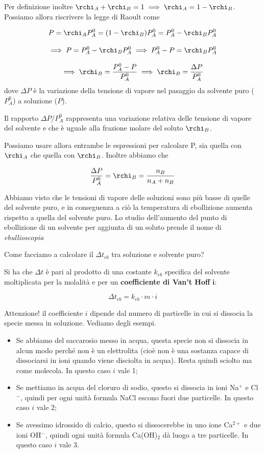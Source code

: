 Per definizione inoltre $\rchi_A + \rchi_B = 1 \implies \rchi_A = 1 - \rchi_B$. Possiamo allora riscrivere la legge di Raoult come 

$$P=\rchi_AP^0_A=(1- \rchi_B)P^0_A=P^0_A - \rchi_BP^0_A$$

$$\implies P=P^0_A - \rchi_BP^0_A \implies P^0_A - P = \rchi_BP^0_A$$

$$\implies \rchi_B=\frac{P^0_A - P}{P^0_A} \implies \rchi_B=\frac{\Delta P}{P^0_A}$$
dove $\Delta P$ è la variazione della tensione di vapore nel pasaggio da solvente puro ($P_A^0$) a soluzione ($P$).

Il rapporto $\Delta P/P_A^0$ rappresenta una variazione relativa delle tensione di vapore del solvente e che è uguale alla frazione molare del soluto $\rchi_B$.

Possiamo usare allora entrambe le espressioni per calcolare P, sia quella con $\rchi_A$ che quella con $\rchi_B$. Inoltre abbiamo che

$$\frac{\Delta P}{P_A^0}= \rchi_B = \frac{n_B}{n_A + n_B}$$

Abbiamo visto che le tensioni di vapore delle soluzioni sono più basse di quelle del solvente puro, e in conseguenza a ciò la temperatura di ebollizione aumenta rispetto a quella del solvente puro. Lo studio dell'aumento del punto di ebollizione di un solvente per aggiunta di un soluto prende il nome di \textit{ebullioscopia}

Come facciamo a calcolare il $\Delta t_{eb}$ tra soluzione e solvente puro?

Si ha che $\Delta t$ è pari al prodotto di una costante $k_{eb}$ specifica del solvente moltiplicata per la molalità e per un \textbf{coefficiente di Van't Hoff} $\boldsymbol{i}$:

$$\Delta t_{eb} = k_{eb} \cdot m \cdot i$$

Attenzione! il coefficiente $i$ dipende dal numero di particelle in cui si dissocia la specie messa in soluzione. Vediamo degli esempi.

\begin{itemize}
    \item Se abbiamo del saccarosio messo in acqua, questa specie non si dissocia in alcun modo perché non è un elettrolita (cioè non è una sostanza capace di dissociarsi in ioni quando viene disciolta in acqua). Resta quindi sciolto ma come molecola. In questo caso $i$ vale 1;
    \item Se mettiamo in acqua del cloruro di sodio, questo si dissocia in ioni Na$^+$ e Cl$^-$, quindi per ogni unità formula NaCl escono fuori due particelle. In questo caso $i$ vale 2;
    \item Se avessimo idrossido di calcio, questo si dissocerebbe in uno ione Ca$^{2+}$ e due ioni OH$^-$, quindi ogni unità formula Ca(OH)$_2$ dà luogo a tre particelle. In questo caso $i$ vale 3.
\end{itemize}


